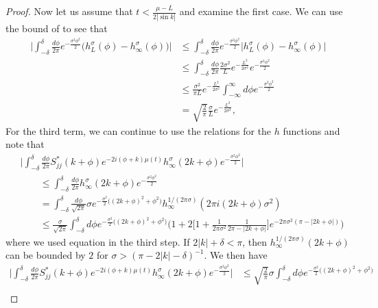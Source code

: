 \documentclass[../thesis-main/thesis-main]{subfiles}
\begin{document}
\begin{proof}
Now let us assume that $t < \frac{\mu - L}{2|\sin k |}$ and examine the first case.  We can use the bound of  to see that
\begin{align}
  \Big| \int_{-\delta}^\delta \frac{d\phi}{2\pi} e^{-\frac{\sigma^2\phi^2}{2}} \big(h_{L}^\sigma(\phi) - h_{\infty}^\sigma(\phi)\big) \Big| &\leq \int_{-\delta}^\delta \frac{d\phi}{2\pi} e^{-\frac{\sigma^2\phi^2}{2}} \big| h_L^\sigma(\phi) - h_\infty^\sigma(\phi)\big|\\
   &\leq \int_{-\delta}^\delta \frac{d\phi}{2\pi}  \frac{2\sigma^2}{L} e^{- \frac {L^2}{2\sigma^2}}e^{-\frac{\sigma^2\phi^2}{2}}\\
   & \leq \frac{\sigma^2}{\pi L} e^{ - \frac{L^2}{2\sigma^2}} \int_{-\infty}^\infty d\phi e^{ - \frac{\sigma^2 \phi^2}{2}}\\
   &= \sqrt{\frac{2}{\pi}} \frac{\sigma}{L} e^{-\frac{L^2}{2\sigma^2}}\label{eq:gaussian_approx_L_to_infinity},
\end{align}
For the third term, we can continue to use the relations for the $h$ functions and note that
\begin{align}
 &\Big| \int_{-\delta}^\delta \frac{d\phi}{2\pi} S_{jj}^*(k+\phi) e^{- 2 i (\phi + k)\mu(t)} h_\infty^\sigma(2 k+\phi) e^{-\frac{\sigma^2\phi^2}{2}} \Big| \nonumber\\
  & \qquad \leq \int_{-\delta}^\delta \frac{d\phi}{2\pi} h_{\infty}^\sigma(2k+\phi) e^{-\frac{\sigma^2\phi^2}{2}} \\
  & \qquad = \int_{-\delta}^\delta  \frac{d\phi}{\sqrt{2\pi}} \sigma e^{ -\frac{\sigma^2}{2} \big( (2k+ \phi)^2 + \phi^2\big)} h_{\infty}^{1/(2\pi\sigma)}(2\pi i (2k+\phi) \sigma^2) \\
  &\qquad \leq \frac{\sigma}{\sqrt{2\pi}} \int_{-\delta}^{\delta} d\phi e^{ -\frac{\sigma^2}{2} \big( (2k+ \phi)^2 + \phi^2\big)}\Big( 1 + 2 \Big[ 1 + \frac{1}{2\pi \sigma^2} \frac{1}{ 2\pi - |2k + \phi|}\Big] e^{- 2\pi \sigma^2 (\pi - |2k + \phi|)}\Big)\label{eq:gaussian_k_offset_midstep}
\end{align}
where we used equation  in the third step.  If $2|k|+ \delta < \pi$, then $h_{\infty}^{1/(2\pi\sigma)} (2k+\phi)$ can be bounded by $2$ for $\sigma > (\pi - 2|k| - \delta)^{-1}$.  We then have
\begin{align}
 \Big| \int_{-\delta}^\delta \frac{d\phi}{2\pi} S_{jj}^*(k+\phi) e^{- 2 i (\phi + k)\mu(t)} h_\infty^\sigma(2 k+\phi) e^{-\frac{\sigma^2\phi^2}{2}}\Big|&\leq \sqrt{\frac{2}{\pi}} \sigma \int_{-\delta}^\delta d\phi e^{- \frac{\sigma^2}{2} \big( (2k + \phi)^2 + \phi^2\big)}\\

\end{align}
\end{proof}
\end{document}
